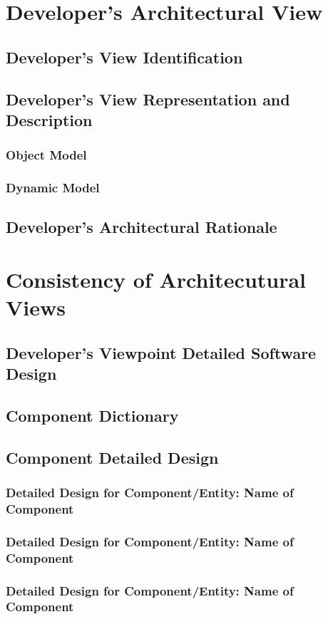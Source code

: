 \documentclass[12pt, oneside, letterpaper]{report}
\begin{document}
	\section{Developer's Architectural View}
		 \subsection{Developer's View Identification}
		 \subsection{Developer's View Representation and Description}
			\subsubsection{Object Model}
			\subsubsection{Dynamic Model}
		 \subsection{Developer's Architectural Rationale}
	\section{Consistency of Architecutural Views}
		\subsection{Developer's Viewpoint Detailed Software Design}
		\subsection{Component Dictionary}
		\subsection{Component Detailed Design}
			\subsubsection{Detailed Design for Component/Entity: Name of Component}
			\subsubsection{Detailed Design for Component/Entity: Name of Component}
			\subsubsection{Detailed Design for Component/Entity: Name of Component}
\end{document}

